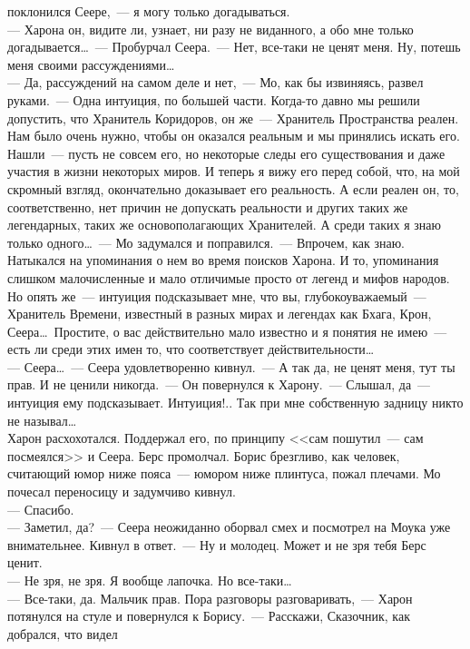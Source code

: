 поклонился Сеере,~--- я могу только догадываться.\\
--- Харона он, видите ли, узнает, ни разу не виданного, а обо мне только 
догадывается\ldots~--- Пробурчал Сеера.~--- Нет, все-таки не ценят меня. Ну, 
потешь меня своими рассуждениями\ldots\\
--- Да, рассуждений на самом деле и нет,~--- Мо, как бы извиняясь, 
развел руками.~–-- 
Одна интуиция, по большей части. Когда-то давно мы решили допустить, что 
Хранитель Коридоров, он же~--- Хранитель Пространства реален. Нам было очень 
нужно, чтобы он оказался реальным и мы принялись искать его. Нашли~--- пусть не 
совсем его, но некоторые следы его существования и даже участия в жизни 
некоторых миров. И теперь я вижу его перед собой, что, на мой скромный взгляд, 
окончательно доказывает его реальность. А если реален он, то, соответственно, 
нет причин не допускать реальности и других таких же легендарных, таких же 
основополагающих Хранителей. А среди таких я знаю только одного\ldots~--- Мо 
задумался 
и поправился.~--- Впрочем, как знаю. Натыкался на упоминания о нем во время 
поисков Харона. И то, упоминания слишком малочисленные и мало отличимые просто 
от легенд и мифов народов. Но опять же~--- интуиция подсказывает мне, что вы, 
глубокоуважаемый~--- Хранитель Времени, известный в разных мирах и легендах как 
Бхага, Крон, Сеера\ldots\ Простите, о вас действительно мало известно и я 
понятия не имею~--- есть ли среди этих имен то, что соответствует действительности\ldots\\
--- Сеера\ldots~--- Сеера удовлетворенно кивнул.~--- А так да, не ценят меня, тут 
ты прав. И не ценили никогда.~--- Он повернулся к Харону.~--- Слышал, да~--- интуиция 
ему подсказывает. Интуиция!.. Так при мне собственную задницу никто не называл\ldots\\
Харон расхохотался. Поддержал его, по принципу <<сам пошутил~--- сам 
посмеялся>> и Сеера. Берс промолчал. Борис брезгливо, как человек, 
считающий юмор ниже пояса~--– юмором ниже плинтуса, пожал плечами. Мо почесал переносицу и задумчиво кивнул.\\
--- Спасибо. \\
--- Заметил, да?~--- Сеера неожиданно оборвал смех и посмотрел на Моука уже 
внимательнее. Кивнул в ответ.~--- Ну и молодец. Может и не зря тебя Берс ценит.\\
--- Не зря, не зря. Я вообще лапочка. Но все-таки\ldots\\
--- Все-таки, да. Мальчик прав. Пора разговоры разговаривать,~--- Харон потянулся 
на стуле и повернулся к Борису.~--- Расскажи, Сказочник, как добрался, что видел 
